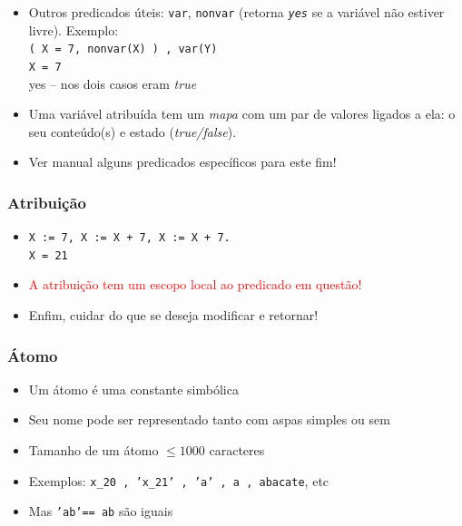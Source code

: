 \documentclass[10pt]{beamer}
\begin{document}
\begin{frame} [allowframebreaks=0.9]
\begin{itemize}
\item Outros predicados úteis: \texttt{var}, \texttt{nonvar} (retorna \texttt{\textit{yes}} se a variável não estiver livre). Exemplo:\\
\texttt{( X = 7, nonvar(X) ) , var(Y) }\\
\texttt{X = 7}\\
yes -- nos dois casos eram \textit{true}\\

\item Uma variável atribuída tem um \textit{mapa} com um par de valores ligados a ela: o seu conteúdo(s) e estado (\textit{true/false}).

\item Ver manual alguns predicados específicos para este fim!

  \end{itemize}
    
\end{frame}

\begin{frame}
    \frametitle{Atribuição}


   
\begin{itemize}
  \item   \texttt{X := 7, X := X + 7, X := X + 7.}\\
     \texttt{X = 21}
     
   \item  \textcolor{red}{A atribuição tem um escopo local ao predicado em questão!}

   \item Enfim, cuidar do que se deseja modificar e retornar!
\end{itemize}

\end{frame}


\begin{frame}
    \frametitle{Átomo}
   
   \begin{itemize}
    
     \item Um átomo é uma constante simbólica
     \item Seu nome pode ser representado tanto com aspas simples ou sem
     \item Tamanho de um átomo $\le 1000$ caracteres
     \item Exemplos: \texttt{x\_20 , 'x\_21' , 'a' , a , abacate}, etc
     \item Mas \texttt{'ab'== ab} são iguais

   \end{itemize}
      
\end{frame}
\end{document}
